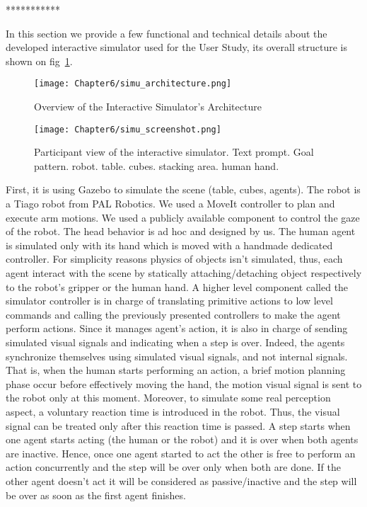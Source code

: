 ***********

In this section we provide a few functional and technical details about the developed interactive simulator used for the User Study, its overall structure is shown on fig~\ref{fig:simu_architecture}.

\begin{figure}
    \texttt{[image: Chapter6/simu\_architecture.png]}
    \caption{Overview of the Interactive Simulator's Architecture}
    \label{fig:simu_architecture}
\end{figure}

\begin{figure}
    \centering
    \texttt{[image: Chapter6/simu\_screenshot.png]}
    \caption{Participant view of the interactive simulator. Text prompt. Goal pattern. robot. table. cubes. stacking area. human hand.}
    \label{fig:simu_view}
\end{figure}

First, it is using Gazebo to simulate the scene (table, cubes, agents). 
The robot is a Tiago robot from PAL Robotics. We used a MoveIt controller to plan and execute arm motions. We used a publicly available component to control the gaze of the robot. The head behavior is ad hoc and designed by us.
The human agent is simulated only with its hand which is moved with a handmade dedicated controller. 
For simplicity reasons physics of objects isn't simulated, thus, each agent interact with the scene by statically attaching/detaching object respectively to the robot's gripper or the human hand.
A higher level component called the simulator controller is in charge of translating primitive actions to low level commands and calling the previously presented controllers to make the agent perform actions. Since it manages agent's action, it is also in charge of sending simulated visual signals and indicating when a step is over. Indeed, the agents synchronize themselves using simulated visual signals, and not internal signals. That is, when the human starts performing an action, a brief motion planning phase occur before effectively moving the hand, the motion visual signal is sent to the robot only at this moment. Moreover, to simulate some real perception aspect, a voluntary reaction time is introduced in the robot. Thus, the visual signal can be treated only after this reaction time is passed. A step starts when one agent starts acting (the human or the robot) and it is over when both agents are inactive. Hence, once one agent started to act the other is free to perform an action concurrently and the step will be over only when both are done. If the other agent doesn't act it will be considered as passive/inactive and the step will be over as soon as the first agent finishes.


